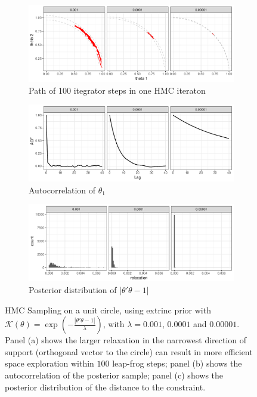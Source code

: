 \documentclass[10pt]{article}
\newcommand{\mc}[1]{\mathcal{#1}}
\DeclareMathOperator{\1}{\mathbbm{1}}
\begin{document}
\begin{figure}[H]
\centering
   \begin{subfigure}[b]{0.8\textwidth}
    \includegraphics[width=1\textwidth]{unit_circle_100steps}
    \caption{Path of 100 itegrator steps in one HMC iteraton}
	\end{subfigure}
    \begin{subfigure}[b]{0.8\textwidth}
     \includegraphics[width=1\textwidth]{unit_circle_acf}
     \caption{Autocorrelation of $\theta_1$}
     	\end{subfigure}
    \begin{subfigure}[b]{0.8\textwidth}
    \includegraphics[width=1\textwidth]{unit_circle_violation}
         \caption{Posterior distribution of  $|\theta'\theta-1|$}
    	\end{subfigure}
\caption{HMC Sampling on a unit circle, using extrinc prior with $\mc K(\theta)=\exp(-\frac{|\theta'\theta -1|}{\lambda})$, with $\lambda=0.001$, $0.0001$ and $0.00001$. Panel (a) shows the larger relaxation in the narrowest direction of support (orthogonal vector to the circle) can result in more efficient space exploration within $100$ leap-frog steps; panel (b) shows the autocorrelation of the posterior sample; panel (c) shows the posterior distribution of the distance to the constraint.}
\label{unit_circle}
\end{figure}
\end{document}
